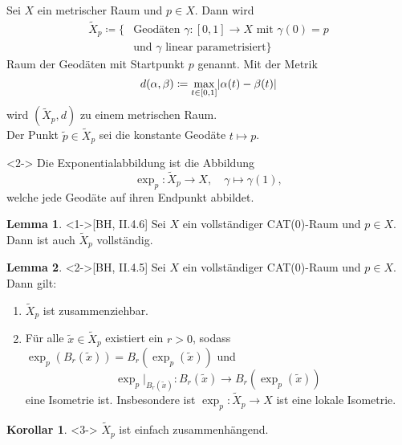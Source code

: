 \documentclass{beamer}
\newcommand{\I}{\left[0,1\right]} %
\renewcommand{\emph}[1]{\textcolor{Emph}{#1}}
\DeclarePairedDelimiter\abs{\lvert}{\rvert}%
\theoremstyle{definition}
\newtheorem*{lem}{Lemma}
\newtheorem*{kor}{Korollar}
\begin{document}
\begin{frame}
  \begin{definition}
    Sei $X$ ein metrischer Raum und $p \in X$. Dann wird
    \begin{align*}
      \tilde{X}_p \coloneqq \{ &\text{Geodäten } \gamma : \I \to X \text{ mit } \gamma(0) = p\\
      &\text{und $\gamma$ linear parametrisiert} \}
    \end{align*}
    \emph{Raum der Geodäten mit Startpunkt $p$} genannt. Mit der Metrik
    \[ d(\alpha, \beta) \coloneqq \max_{t \in \I} \abs{\alpha(t) - \beta(t)} \]
    wird $(\tilde{X}_p, d)$ zu einem metrischen Raum.\\
    Der Punkt $\tilde{p} \in \tilde{X}_p$ sei die konstante Geodäte $t \mapsto p$.
  \end{definition}

  \begin{definition}<2->
    Die \emph{Exponentialabbildung} ist die Abbildung
    \[ \exp_p : \tilde{X}_p \to X, \quad \gamma \mapsto \gamma(1), \]
    welche jede Geodäte auf ihren Endpunkt abbildet.
  \end{definition}
\end{frame}

\begin{frame}
  \begin{lem}<1->[BH, II.4.6]
    Sei $X$ ein vollständiger CAT($0$)-Raum und $p \in X$. Dann ist auch $\tilde{X}_p$ vollständig.
  \end{lem}

  \begin{lem}<2->[BH, II.4.5]
    Sei $X$ ein vollständiger CAT($0$)-Raum und $p \in X$. Dann gilt:
    \begin{enumerate}
      \item $\tilde{X}_p$ ist zusammenziehbar.
      \item Für alle $\tilde{x} \in \tilde{X}_p$ existiert ein $r > 0$, sodass $\exp_p(B_r(\tilde{x})) = B_r(\exp_p(\tilde{x}))$ und
      \[ \exp_p|_{B_r(\tilde{x})} : B_r(\tilde{x}) \to B_r(\exp_p(\tilde{x})) \]
      eine Isometrie ist. Insbesondere ist $\exp_p : \tilde{X}_p \to X$ ist eine lokale Isometrie.
    \end{enumerate}
  \end{lem}

  \begin{kor}<3->
    $\tilde{X}_p$ ist einfach zusammenhängend.
  \end{kor}
\end{frame}
\end{document}
